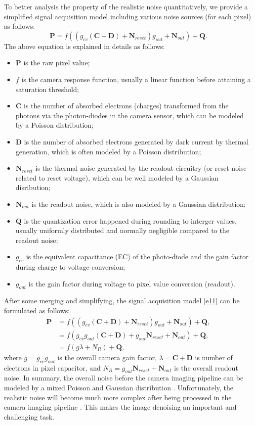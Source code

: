 To better analysis the property of the realistic noise quantitatively, we provide a simplified signal acquisition model \cite{Foipractical} including various noise sources (for each pixel) as follows:
\begin{equation}
\label{e11}
\bm{P} = f((g_{cv}(\bm{C}+\bm{D})+\bm{N}_{reset})g_{out}+\bm{N}_{out})+\bm{Q}.
\end{equation}
The above equation is explained in details as follows: 
\begin{itemize}
\item $\bm{P}$ is the raw pixel value;
\item $f$ is the camera response function, usually a linear function before attaining a saturation threshold;
\item $\bm{C}$ is the number of absorbed electrons (charges) transformed from the photons via the photon-diodes in the camera sensor, which can be modeled by a Poisson distribution;
\item $\bm{D}$ is the number of absorbed electrons generated by dark current by thermal generation, which is often modeled by a Poisson distribution;
\item $\bm{N}_{reset}$ is the thermal noise generated by the readout circuitry (or reset noise related to reset voltage), which can be well modeled by a Gaussian disribution;
\item $\bm{N}_{out}$ is the readout noise, which is also modeled by a Gaussian distribution;
\item $\bm{Q}$ is the quantization error happened during rounding to interger values, usually uniformly distributed and normally negligible compared to the readout noise;
\item $g_{cv}$ is the equivalent capacitance (EC) of the photo-diode and the gain factor during charge to voltage conversion;
\item $g_{out}$ is the gain factor during voltage to pixel value conversion (readout).
\end{itemize}
After some merging and simplifying, the signal acquisition model \ref{e11} can be formulated as follows:
\begin{equation}
\label{e12}
\begin{split}
\textbf{P} 
&=f((g_{cv}(\textbf{C}+\textbf{D})+\textbf{N}_{reset})g_{out}+\textbf{N}_{out})+\textbf{Q},
\\
&=f(g_{cv}g_{out}(\textbf{C}+\textbf{D})+g_{out}\textbf{N}_{reset}+\textbf{N}_{out})+\textbf{Q},
\\
&=f(g\lambda+N_{R})+\textbf{Q},
\end{split}
\end{equation}
where $g = g_{cv}g_{out}$ is the overall camera gain factor, $\lambda=\textbf{C}+\textbf{D}$ is number of electrons in pixel capacitor, and $N_{R}=g_{out}\textbf{N}_{reset}+\textbf{N}_{out}$ is the overall readout noise. In summary, the overall noise before the camera imaging pipeline can be modeled by a mixed Poisson and Gaussian distribution \cite{Foipractical}. Unfortunately, the realistic noise will become much more complex after being processed in the camera imaging pipeline \cite{crosschannel2016}. This makes the image denoising an important and challenging task. 

